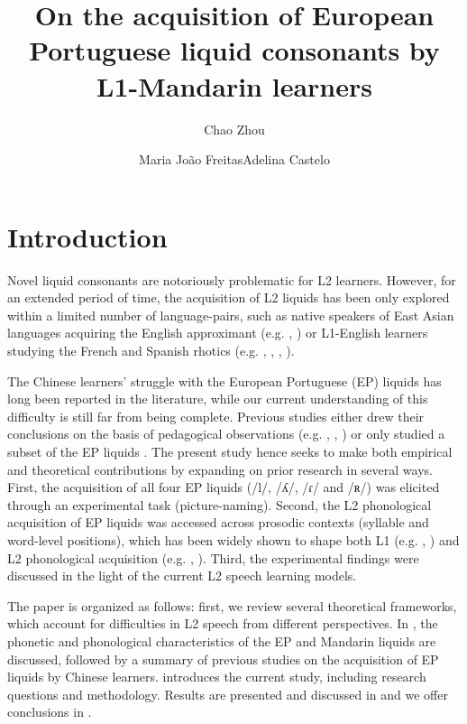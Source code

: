 \documentclass[output=paper]{../langscibook}
\author{Chao Zhou\affiliation{University of Lisbon}\and Maria João Freitas\affiliation{University of Lisbon}\lastand Adelina Castelo\affiliation{University of Lisbon}}
\title{On the acquisition of European Portuguese liquid consonants by L1-Mandarin learners}
\begin{document}
\maketitle
{}


\section{Introduction}

Novel liquid consonants are notoriously problematic for L2 learners. However, for an extended period of time, the acquisition of L2 liquids has been only explored within a limited number of language-pairs, such as native speakers of East Asian languages acquiring the English approximant (e.g. \citealt{AoyamaEtAl2004}, \citealt{Brown1998}) or L1-English learners studying the French and Spanish rhotics (e.g. \citealt{ColantoniSteele2007,ColantoniSteele2008}, \citealt{Face2006}, \citealt{Steele2009}, \citealt{Waltmunson2005}).

The Chinese learners’ struggle with the European Portuguese (EP) liquids has long been reported in the literature, while our current understanding of this difficulty is still far from being complete. Previous studies either drew their conclusions on the basis of pedagogical observations (e.g. \citealt{Batalha1995}, \citealt{EspadinhaSilva2009}, \citealt{Martins2008}) or only studied a subset of the EP liquids \citep{Oliveira2016}. The present study hence seeks to make both empirical and theoretical contributions by expanding on prior research in several ways. First, the acquisition of all four EP liquids (/l/, /ʎ/, /ɾ/ and /ʀ/) was elicited through an experimental task (picture-naming). Second, the L2 phonological acquisition of EP liquids was accessed across prosodic contexts (syllable and word-level positions), which has been widely shown to shape both L1 (e.g. \citealt{Fikkert1994}, \citealt{Freitas1997}) and L2 phonological acquisition (e.g. \citealt{Waltmunson2005}, \citealt{ColantoniSteele2008}). Third, the experimental findings were discussed in the light of the current L2 speech learning models.

The paper is organized as follows: first, we review several theoretical frameworks, which account for difficulties in L2 speech from different perspectives. In , the phonetic and phonological characteristics of the EP and Mandarin liquids are discussed, followed by a summary of previous studies on the acquisition of EP liquids by Chinese learners.  introduces the current study, including research questions and methodology. Results are presented and discussed in  and we offer conclusions in .%
\end{document}
